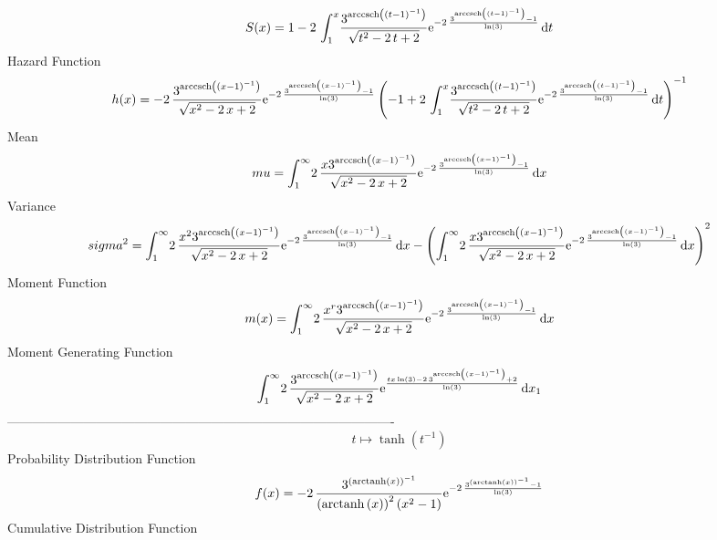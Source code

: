 \documentclass[12pt]{article}
\begin{document}
 $$ S(x)=1-2\,\int_{1}^{x}\!{\frac {{3}^{{\rm arccsch} \left( \left( t-1
 \right) ^{-1}\right)}}{\sqrt {{t}^{2}-2\,t+2}}{{\rm e}^{-2\,{\frac {{
3}^{{\rm arccsch} \left( \left( t-1 \right) ^{-1}\right)}-1}{\ln 
 \left( 3 \right) }}}}}\,{\rm d}t
$$ Hazard Function 
 $$ h(x)=-2\,{\frac {{3}^{{\rm arccsch} \left( \left( x-1 \right) ^{-1}\right)}
}{\sqrt {{x}^{2}-2\,x+2}}{{\rm e}^{-2\,{\frac {{3}^{{\rm arccsch} 
\left( \left( x-1 \right) ^{-1}\right)}-1}{\ln  \left( 3 \right) }}}}
 \left( -1+2\,\int_{1}^{x}\!{\frac {{3}^{{\rm arccsch} \left( \left( t
-1 \right) ^{-1}\right)}}{\sqrt {{t}^{2}-2\,t+2}}{{\rm e}^{-2\,{\frac 
{{3}^{{\rm arccsch} \left( \left( t-1 \right) ^{-1}\right)}-1}{\ln 
 \left( 3 \right) }}}}}\,{\rm d}t \right) ^{-1}}
$$Mean 
 $$ mu=\int_{1}^{\infty }\!2\,{\frac {x{3}^{{\rm arccsch} \left( \left( x-1
 \right) ^{-1}\right)}}{\sqrt {{x}^{2}-2\,x+2}}{{\rm e}^{-2\,{\frac {{
3}^{{\rm arccsch} \left( \left( x-1 \right) ^{-1}\right)}-1}{\ln 
 \left( 3 \right) }}}}}\,{\rm d}x
$$ Variance 
 $$ sigma^2 = \int_{1}^{\infty }\!2\,{\frac {{x}^{2}{3}^{{\rm arccsch} \left(
 \left( x-1 \right) ^{-1}\right)}}{\sqrt {{x}^{2}-2\,x+2}}{{\rm e}^{-2
\,{\frac {{3}^{{\rm arccsch} \left( \left( x-1 \right) ^{-1}\right)}-1
}{\ln  \left( 3 \right) }}}}}\,{\rm d}x- \left( \int_{1}^{\infty }\!2
\,{\frac {x{3}^{{\rm arccsch} \left( \left( x-1 \right) ^{-1}\right)}
}{\sqrt {{x}^{2}-2\,x+2}}{{\rm e}^{-2\,{\frac {{3}^{{\rm arccsch} 
\left( \left( x-1 \right) ^{-1}\right)}-1}{\ln  \left( 3 \right) }}}}}
\,{\rm d}x \right) ^{2}
$$Moment Function 
 $$ m(x) = \int_{1}^{\infty }\!2\,{\frac {{x}^{r}{3}^{{\rm arccsch} \left(
 \left( x-1 \right) ^{-1}\right)}}{\sqrt {{x}^{2}-2\,x+2}}{{\rm e}^{-2
\,{\frac {{3}^{{\rm arccsch} \left( \left( x-1 \right) ^{-1}\right)}-1
}{\ln  \left( 3 \right) }}}}}\,{\rm d}x
$$ Moment Generating Function 
 $$\int_{1}^{\infty }\!2\,{\frac {{3}^{{\rm arccsch} \left( \left( x-1
 \right) ^{-1}\right)}}{\sqrt {{x}^{2}-2\,x+2}}{{\rm e}^{{\frac {tx
\ln  \left( 3 \right) -2\,{3}^{{\rm arccsch} \left( \left( x-1
 \right) ^{-1}\right)}+2}{\ln  \left( 3 \right) }}}}}\,{\rm d}x_{{1}}
$$-------------------------------------------------------------------------------------------  \\$$t\mapsto \tanh \left( {t}^{-1} \right) 
$$Probability Distribution Function 
$$  f(x)=-2\,{\frac {{3}^{ \left( {\rm arctanh} \left(x\right) \right) ^{-1}}}{
 \left( {\rm arctanh} \left(x\right) \right) ^{2} \left( {x}^{2}-1
 \right) }{{\rm e}^{-2\,{\frac {{3}^{ \left( {\rm arctanh} \left(x
\right) \right) ^{-1}}-1}{\ln  \left( 3 \right) }}}}}
$$Cumulative Distribution Function  
\end{document}
